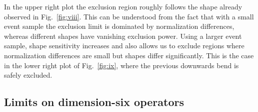 \documentclass{JHEP3}
\begin{document}
In the upper right plot the exclusion region roughly follows the shape already observed in Fig.~\ref{fig:viii}. 
This can be understood from the fact that with a small event sample the exclusion limit is dominated by 
normalization differences, whereas different shapes have vanishing exclusion power. 
Using a larger event sample, shape sensitivity increases and also allows us to exclude regions where normalization differences 
are small but shapes differ significantly.
This is the case in the lower right plot of Fig.~\ref{fig:ix}, where the previous downwards bend is safely excluded.








\subsection{Limits on dimension-six operators}
\label{DimSixLimits}
\end{document}
